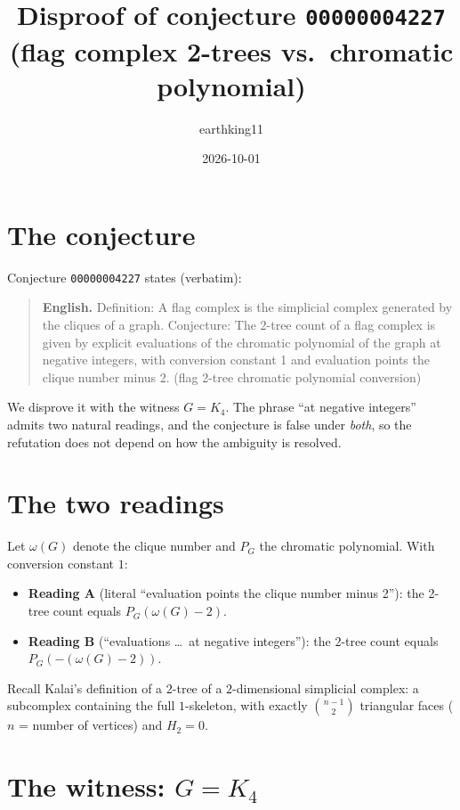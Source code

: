 \documentclass[11pt]{article}
\title{Disproof of conjecture \texttt{00000004227} \\ (flag complex 2-trees vs.\ chromatic polynomial)}
\author{earthking11}
\date{2026-10-01}
\begin{document}
\maketitle

\section{The conjecture}

Conjecture \texttt{00000004227} states (verbatim):

\begin{quote}
\textbf{English.} Definition: A flag complex is the simplicial complex generated
by the cliques of a graph. Conjecture: The 2-tree count of a flag complex is
given by explicit evaluations of the chromatic polynomial of the graph at
negative integers, with conversion constant 1 and evaluation points the clique
number minus 2. (flag 2-tree chromatic polynomial conversion)
\end{quote}

We disprove it with the witness $G = K_4$.  The phrase ``at negative integers''
admits two natural readings, and the conjecture is false under \emph{both}, so
the refutation does not depend on how the ambiguity is resolved.

\section{The two readings}

Let $\omega(G)$ denote the clique number and $P_G$ the chromatic polynomial.
With conversion constant $1$:

\begin{itemize}
\item \textbf{Reading A} (literal ``evaluation points the clique number
minus 2''): the 2-tree count equals $P_G(\omega(G) - 2)$.
\item \textbf{Reading B} (``evaluations \dots\ at negative integers''): the
2-tree count equals $P_G(-(\omega(G) - 2))$.
\end{itemize}

Recall Kalai's definition of a $2$-tree of a $2$-dimensional simplicial complex:
a subcomplex containing the full $1$-skeleton, with exactly $\binom{n-1}{2}$
triangular faces ($n$ = number of vertices) and $H_2 = 0$.

\section{The witness: $G = K_4$}
\end{document}
